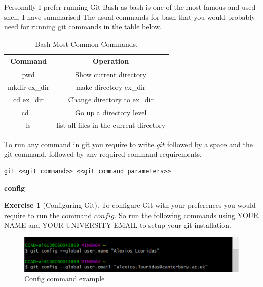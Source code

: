 \documentclass[
]{book}
\theoremstyle{definition}
\theoremstyle{definition}
\theoremstyle{definition}
\newtheorem{exercise}{Exercise}[chapter]
\theoremstyle{remark}
\begin{document}
Personally I prefer running Git Bash as bash is one of the most famous and used shell.
I have summarised The usual commands for bash that you would probably need for running git commands in the table below.

\begin{table}

\caption{\label{tab:unnamed-chunk-6}Bash Most Common Commands.}
\centering
\begin{tabular}[t]{c|c}
\hline
Command & Operation\\
\hline
pwd & Show current directory\\
\hline
mkdir ex\_dir & make directory ex\_dir\\
\hline
cd ex\_dir & Change directory to ex\_dir\\
\hline
cd .. & Go up a directory level\\
\hline
ls & list all files in the current directory\\
\hline
\end{tabular}
\end{table}

To run any command in git you require to write \(git\) followed by a space and the git command, followed by any required command requirements.

\begin{verbatim}
git <<git command>> <<git command parameters>>
\end{verbatim}

\textbf{config}

\begin{exercise}[Configuring Git]
\protect\hypertarget{exr:unnamed-chunk-7}{}{\label{exr:unnamed-chunk-7} {} }To configure Git with your preferences you would require to run the command \(config\). So run the following commands using YOUR NAME and YOUR UNIVERSITY EMAIL to setup your git installation.
\end{exercise}

\begin{figure}

{\centering \includegraphics[width=0.8\linewidth]{images/Git init} 

}

\caption{Config command example}\label{fig:unnamed-chunk-8}
\end{figure}
\end{document}

